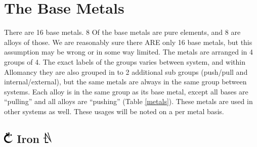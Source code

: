 \documentclass[conference]{IEEEtran}
\begin{document}
\section{\textbf{The Base Metals}}
There are 16 base metals.\cite{WoF} 8 Of the base metals are pure elements, and 8 are alloys of those.\cite{TFE-CH7}  We are reasonably sure there ARE only 16 base metals, but this assumption may be wrong or in some way limited.\cite{HoA-CH70}\cite{base16} The metals are arranged in 4 groups of 4.\cite{AL-TB}  The exact labels of the groups varies between system,\cite{FE-TB}\cite{HE-TB} and within Allomancy they are also grouped in to 2 additional sub groups (push/pull and internal/external),\cite{ARS} but the same metals are always in the same group between systems.\cite{FE-TB}\cite{HE-TB}  Each alloy is in the same group as its base metal,\cite{AL-TB} except all bases are ``pulling'' and all alloys are ``pushing''\cite{ARS} (Table \ref{metals}).
These metals are used in other systems as well.  These usages will be noted on a per metal basis.
\newpage
\subsection*{\includegraphics[height=1em]{images/Iron.png}  \textbf{Iron} \includegraphics[height=1em]{images/Iron_(Feruchemy).png}}
\end{document}
